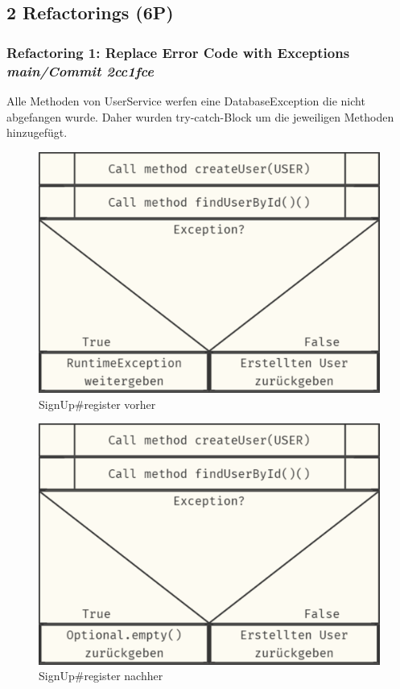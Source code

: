 \subsection{2 Refactorings (6P)}

\subsubsection*{Refactoring 1: Replace Error Code with Exceptions \textit{main/Commit 2cc1fce}} 
Alle Methoden von UserService werfen eine DatabaseException die nicht abgefangen wurde. Daher wurden try-catch-Block um die jeweiligen Methoden hinzugefügt.


\begin{figure}[h!]
    \centering
    \includegraphics[width=0.75\linewidth]{kapitel7_refactoring/ref_before.pdf}
    \caption{SignUp\#register vorher}
\end{figure}


\begin{figure}[h!]
    \centering
    \includegraphics[width=0.75\linewidth]{kapitel7_refactoring/ref_after.pdf}
    \caption{SignUp\#register nachher}
\end{figure}
 \newpage
